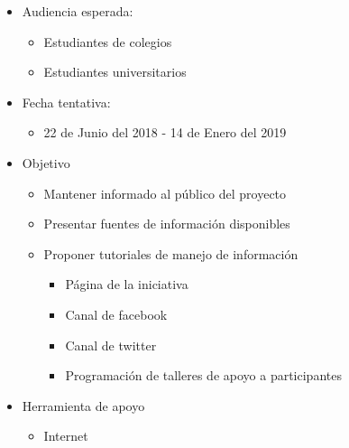 \documentclass{article}
\begin{document}
\begin{enumerate}
\begin{itemize}
\item Audiencia esperada:
\begin{itemize}
\item Estudiantes de colegios
\item Estudiantes universitarios
\end{itemize}
\item Fecha tentativa:
\begin{itemize}
\item 22 de Junio del 2018 - 14 de Enero del 2019
\end{itemize}
\item Objetivo
\begin{itemize}
\item Mantener informado al público del proyecto
\item Presentar fuentes de información disponibles
\item Proponer tutoriales de manejo de información
\begin{itemize}
\item Página de la iniciativa 
\item Canal de facebook
\item Canal de twitter
\item Programación de talleres de apoyo a participantes
\end{itemize}
\end{itemize}
\item Herramienta de apoyo
\begin{itemize}
\item Internet
\end{itemize}
\end{itemize}


\end{enumerate}
\end{document}

